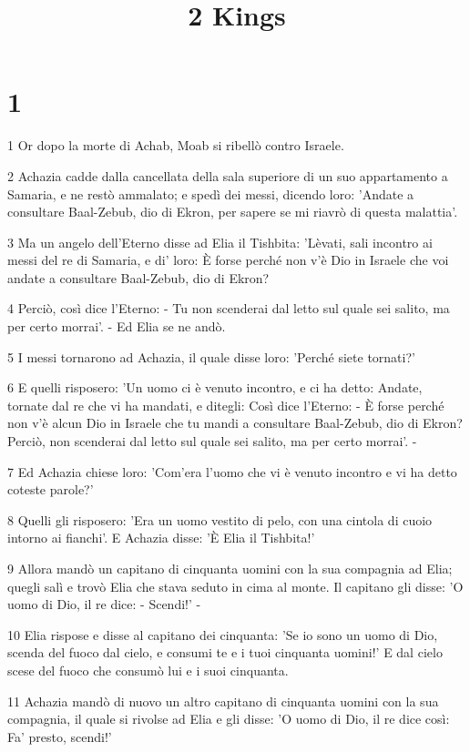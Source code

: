 

\title{2 Kings}


\chapter{1}

\par 1 Or dopo la morte di Achab, Moab si ribellò contro Israele.
\par 2 Achazia cadde dalla cancellata della sala superiore di un suo appartamento a Samaria, e ne restò ammalato; e spedì dei messi, dicendo loro: 'Andate a consultare Baal-Zebub, dio di Ekron, per sapere se mi riavrò di questa malattia'.
\par 3 Ma un angelo dell'Eterno disse ad Elia il Tishbita: 'Lèvati, sali incontro ai messi del re di Samaria, e di' loro: È forse perché non v'è Dio in Israele che voi andate a consultare Baal-Zebub, dio di Ekron?
\par 4 Perciò, così dice l'Eterno: - Tu non scenderai dal letto sul quale sei salito, ma per certo morrai'. - Ed Elia se ne andò.
\par 5 I messi tornarono ad Achazia, il quale disse loro: 'Perché siete tornati?'
\par 6 E quelli risposero: 'Un uomo ci è venuto incontro, e ci ha detto: Andate, tornate dal re che vi ha mandati, e ditegli: Così dice l'Eterno: - È forse perché non v'è alcun Dio in Israele che tu mandi a consultare Baal-Zebub, dio di Ekron? Perciò, non scenderai dal letto sul quale sei salito, ma per certo morrai'. -
\par 7 Ed Achazia chiese loro: 'Com'era l'uomo che vi è venuto incontro e vi ha detto coteste parole?'
\par 8 Quelli gli risposero: 'Era un uomo vestito di pelo, con una cintola di cuoio intorno ai fianchi'. E Achazia disse: 'È Elia il Tishbita!'
\par 9 Allora mandò un capitano di cinquanta uomini con la sua compagnia ad Elia; quegli salì e trovò Elia che stava seduto in cima al monte. Il capitano gli disse: 'O uomo di Dio, il re dice: - Scendi!' -
\par 10 Elia rispose e disse al capitano dei cinquanta: 'Se io sono un uomo di Dio, scenda del fuoco dal cielo, e consumi te e i tuoi cinquanta uomini!' E dal cielo scese del fuoco che consumò lui e i suoi cinquanta.
\par 11 Achazia mandò di nuovo un altro capitano di cinquanta uomini con la sua compagnia, il quale si rivolse ad Elia e gli disse: 'O uomo di Dio, il re dice così: Fa' presto, scendi!'
